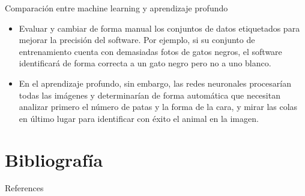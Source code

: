 \documentclass[11pt,aspectratio=169]{beamer}
\begin{document}
\begin{frame}{Comparación entre machine learning y aprendizaje profundo}
	\begin{itemize}
		\item Evaluar y cambiar de forma manual los conjuntos de datos etiquetados para mejorar la precisión del software. 
			Por ejemplo, si su conjunto de entrenamiento cuenta con demasiadas fotos de gatos negros, el software identificará de forma 
			correcta a un gato negro pero no a uno blanco.\pause
		\item En el aprendizaje profundo, sin embargo, las redes neuronales procesarían todas las imágenes y determinarían de forma automática 
			que necesitan analizar primero el número de patas y la forma de la cara, y mirar las colas en último lugar para identificar con 
			éxito el animal en la imagen.
	\end{itemize}	
\end{frame}


\section{Bibliografía}
\begin{frame}[allowframebreaks]{References}
    \nocite{*}
    
    
\end{frame}
\end{document}
